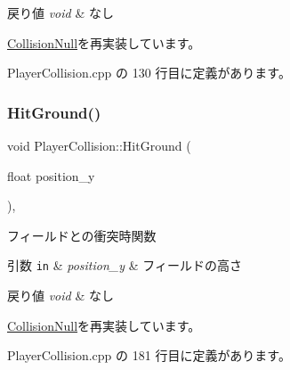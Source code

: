 \begin{DoxyRetVals}{戻り値}
{\em void} & なし \\
\hline
\end{DoxyRetVals}


\mbox{\hyperlink{class_collision_null_a580f507d8918865679feec3cc7b613d1}{Collision\+Null}}を再実装しています。



 Player\+Collision.\+cpp の 130 行目に定義があります。

\mbox{\label{class_player_collision_a3522ce17b1e1752f2737c2243582ecb0}} 
\subsubsection{\texorpdfstring{Hit\+Ground()}{HitGround()}}
{\footnotesize\ttfamily void Player\+Collision\+::\+Hit\+Ground (\begin{DoxyParamCaption}\item[{float}]{position\+\_\+y }\end{DoxyParamCaption})\hspace{0.3cm}{\ttfamily [override]}, {\ttfamily [virtual]}}



フィールドとの衝突時関数 


\begin{DoxyParams}[1]{引数}
\mbox{\tt in}  & {\em position\+\_\+y} & フィールドの高さ \\
\hline
\end{DoxyParams}

\begin{DoxyRetVals}{戻り値}
{\em void} & なし \\
\hline
\end{DoxyRetVals}


\mbox{\hyperlink{class_collision_null_a75900c2cec4e49336701e2e3c64e5bfe}{Collision\+Null}}を再実装しています。



 Player\+Collision.\+cpp の 181 行目に定義があります。

\mbox{\label{class_player_collision_a5048cc608d72d03d02b23c5533dbfd10}} 
